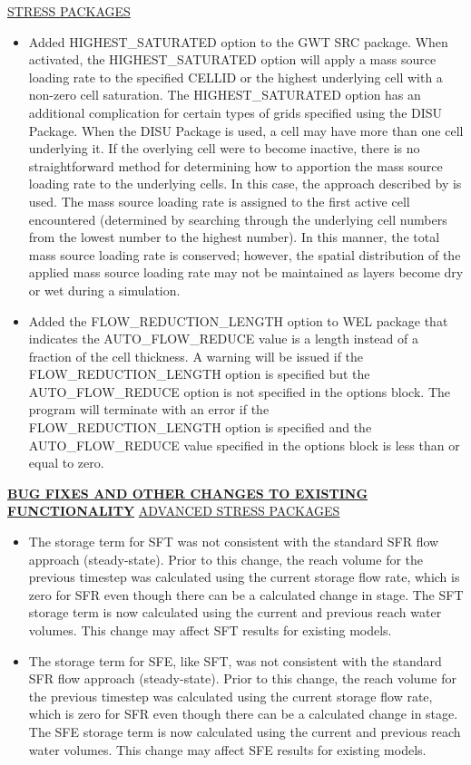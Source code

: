 \underline{STRESS PACKAGES}
\begin{itemize}
\item Added HIGHEST\_SATURATED option to the GWT SRC package. When activated, the HIGHEST\_SATURATED option will apply a mass source loading rate to the specified CELLID or the highest underlying cell with a non-zero cell saturation. The HIGHEST\_SATURATED option has an additional complication for certain types of grids specified using the DISU Package. When the DISU Package is used, a cell may have more than one cell underlying it. If the overlying cell were to become inactive, there is no straightforward method for determining how to apportion the mass source loading rate to the underlying cells. In this case, the approach described by \cite{modflowusg} is used. The mass source loading rate is assigned to the first active cell encountered (determined by searching through the underlying cell numbers from the lowest number to the highest number). In this manner, the total mass source loading rate is conserved; however, the spatial distribution of the applied mass source loading rate may not be maintained as layers become dry or wet during a simulation.
\item Added the FLOW\_REDUCTION\_LENGTH option to WEL package that indicates the AUTO\_FLOW\_REDUCE value is a length instead of a fraction of the cell thickness. A warning will be issued if the FLOW\_REDUCTION\_LENGTH option is specified but the AUTO\_FLOW\_REDUCE option is not specified in the options block. The program will terminate with an error if the FLOW\_REDUCTION\_LENGTH option is specified and the AUTO\_FLOW\_REDUCE value specified in the options block is less than or equal to zero.
\end{itemize}

\textbf{\underline{BUG FIXES AND OTHER CHANGES TO EXISTING FUNCTIONALITY}}
\underline{ADVANCED STRESS PACKAGES}
\begin{itemize}
\item The storage term for SFT was not consistent with the standard SFR flow approach (steady-state). Prior to this change, the reach volume for the previous timestep was calculated using the current storage flow rate, which is zero for SFR even though there can be a calculated change in stage. The SFT storage term is now calculated using the current and previous reach water volumes. This change may affect SFT results for existing models.
\item The storage term for SFE, like SFT, was not consistent with the standard SFR flow approach (steady-state). Prior to this change, the reach volume for the previous timestep was calculated using the current storage flow rate, which is zero for SFR even though there can be a calculated change in stage. The SFE storage term is now calculated using the current and previous reach water volumes. This change may affect SFE results for existing models.
\end{itemize}


